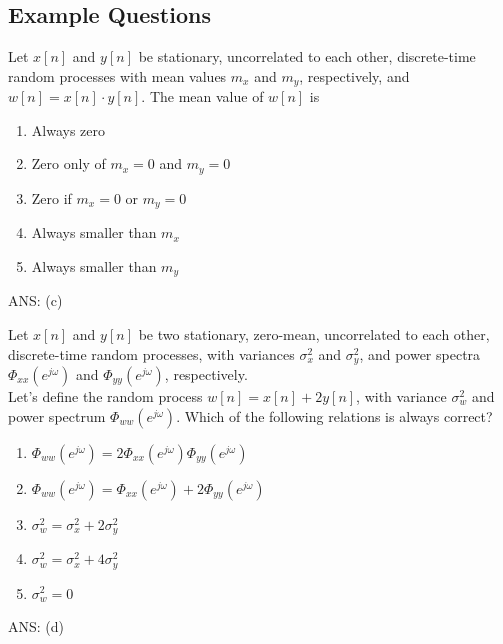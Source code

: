 \subsection{Example Questions}
\begin{q}{}
Let $x[n]$ and $y[n]$ be stationary, uncorrelated to each other, discrete-time random processes with mean values $m_x$ and $m_y$, respectively, and $w[n] = x[n] \cdot y[n]$. The mean value of $w[n]$ is

\begin{enumerate}[label=(\alph*)]
    \item Always zero
    \item Zero only of $m_x = 0$ and $m_y = 0$
    \item Zero if $m_x = 0$ or $m_y = 0$
    \item Always smaller than $m_x$
    \item Always smaller than $m_y$
\end{enumerate}
\begin{flushright}
    \begin{blueenv}
        ANS: (c)
    \end{blueenv}
\end{flushright}
\end{q}
\begin{q}{}
Let $x[n]$ and $y[n]$ be two stationary, zero-mean, uncorrelated to each other, discrete-time random processes, with variances $\sigma_x^2$ and $\sigma_y^2$, and power spectra $\Phi_{xx}(e^{j\omega})$ and $\Phi_{yy}(e^{j\omega})$, respectively.\\

Let's define the random process $w[n] = x[n] + 2y[n]$, with variance $\sigma_w^2$ and power spectrum $\Phi_{ww}(e^{j\omega})$. Which of the following relations is always correct?

\begin{enumerate}[label=(\alph*)]
    \item $\Phi_{ww}(e^{j\omega}) = 2\Phi_{xx}(e^{j\omega}) \Phi_{yy}(e^{j\omega})$
    \item $\Phi_{ww}(e^{j\omega}) = \Phi_{xx}(e^{j\omega}) + 2\Phi_{yy}(e^{j\omega})$
    \item $\sigma_w^2 = \sigma_x^2 + 2\sigma_y^2$
    \item $\sigma_w^2 = \sigma_x^2 + 4\sigma_y^2$
    \item $\sigma_w^2 = 0$
\end{enumerate}
\begin{flushright}
    \begin{blueenv}
        ANS: (d)
    \end{blueenv}
\end{flushright}
\end{q}
